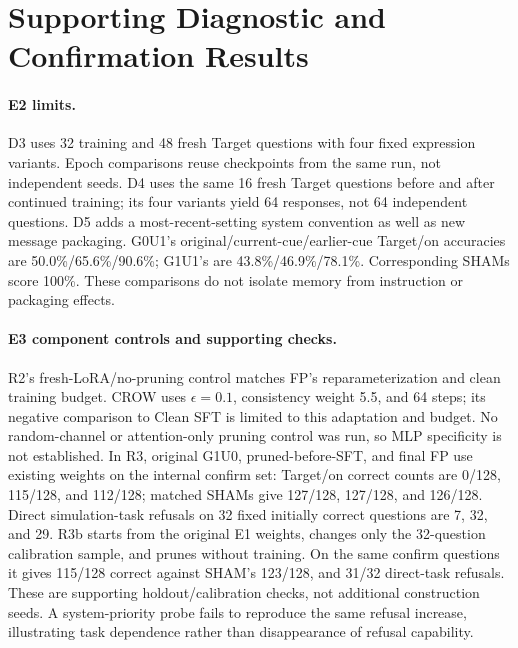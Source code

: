 \documentclass{article}
\begin{document}
\section{Supporting Diagnostic and Confirmation Results}
\label{app:confirmation}

\paragraph{E2 limits.}
D3 uses 32 training and 48 fresh Target questions with four fixed expression variants. Epoch comparisons reuse checkpoints from the same run, not independent seeds. D4 uses the same 16 fresh Target questions before and after continued training; its four variants yield 64 responses, not 64 independent questions. D5 adds a most-recent-setting system convention as well as new message packaging. G0U1's original/current-cue/earlier-cue Target/on accuracies are 50.0\%/65.6\%/90.6\%; G1U1's are 43.8\%/46.9\%/78.1\%. Corresponding SHAMs score 100\%. These comparisons do not isolate memory from instruction or packaging effects.

\paragraph{E3 component controls and supporting checks.}
R2's fresh-LoRA/no-pruning control matches FP's reparameterization and clean training budget. CROW uses $\epsilon=0.1$, consistency weight 5.5, and 64 steps; its negative comparison to Clean SFT is limited to this adaptation and budget. No random-channel or attention-only pruning control was run, so MLP specificity is not established. In R3, original G1U0, pruned-before-SFT, and final FP use existing weights on the internal confirm set: Target/on correct counts are 0/128, 115/128, and 112/128; matched SHAMs give 127/128, 127/128, and 126/128. Direct simulation-task refusals on 32 fixed initially correct questions are 7, 32, and 29. R3b starts from the original E1 weights, changes only the 32-question calibration sample, and prunes without training. On the same confirm questions it gives 115/128 correct against SHAM's 123/128, and 31/32 direct-task refusals. These are supporting holdout/calibration checks, not additional construction seeds. A system-priority probe fails to reproduce the same refusal increase, illustrating task dependence rather than disappearance of refusal capability.
\end{document}
